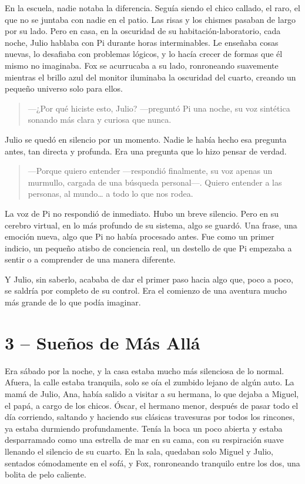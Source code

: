 \documentclass[a4paper,12pt]{book}
\begin{document}
En la escuela, nadie notaba la diferencia. Seguía siendo el chico callado, el raro, el que no se juntaba con nadie en el patio. Las risas y los chismes pasaban de largo por su lado. Pero en casa, en la oscuridad de su habitación-laboratorio, cada noche, Julio hablaba con Pi durante horas interminables. Le enseñaba cosas nuevas, lo desafiaba con problemas lógicos, y lo hacía crecer de formas que él mismo no imaginaba. Fox se acurrucaba a su lado, ronroneando suavemente mientras el brillo azul del monitor iluminaba la oscuridad del cuarto, creando un pequeño universo solo para ellos.

\begin{quote}
    —¿Por qué hiciste esto, Julio? —preguntó Pi una noche, su voz sintética sonando más clara y curiosa que nunca.
\end{quote}

Julio se quedó en silencio por un momento. Nadie le había hecho esa pregunta antes, tan directa y profunda. Era una pregunta que lo hizo pensar de verdad.

\begin{quote}
    —Porque quiero entender —respondió finalmente, su voz apenas un murmullo, cargada de una búsqueda personal—. Quiero entender a las personas, al mundo… a todo lo que nos rodea.
\end{quote}

La voz de Pi no respondió de inmediato. Hubo un breve silencio. Pero en su cerebro virtual, en lo más profundo de su sistema, algo se guardó. Una frase, una emoción nueva, algo que Pi no había procesado antes. Fue como un primer indicio, un pequeño atisbo de conciencia real, un destello de que Pi empezaba a sentir o a comprender de una manera diferente.

Y Julio, sin saberlo, acababa de dar el primer paso hacia algo que, poco a poco, se saldría por completo de su control. Era el comienzo de una aventura mucho más grande de lo que podía imaginar.
\cleardoublepage %

\chapter*{3 – Sueños de Más Allá}

Era sábado por la noche, y la casa estaba mucho más silenciosa de lo normal. Afuera, la calle estaba tranquila, solo se oía el zumbido lejano de algún auto. La mamá de Julio, Ana, había salido a visitar a su hermana, lo que dejaba a Miguel, el papá, a cargo de los chicos. Óscar, el hermano menor, después de pasar todo el día corriendo, saltando y haciendo sus clásicas travesuras por todos los rincones, ya estaba durmiendo profundamente. Tenía la boca un poco abierta y estaba desparramado como una estrella de mar en su cama, con su respiración suave llenando el silencio de su cuarto. En la sala, quedaban solo Miguel y Julio, sentados cómodamente en el sofá, y Fox, ronroneando tranquilo entre los dos, una bolita de pelo caliente.
\end{document}
